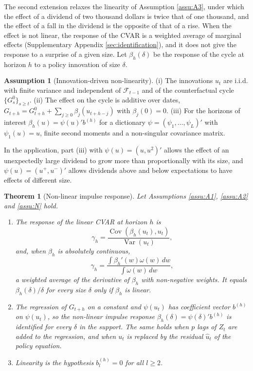 \documentclass[12pt,a4paper]{article}
\newtheorem{thm}{Theorem}
\theoremstyle{definition}
\newtheorem{assumption}{Assumption}
\newcommand{\cov}{\operatorname{Cov}}
\newcommand{\var}{\operatorname{Var}}
\begin{document}
The second extension relaxes the linearity of Assumption \ref{assu:A3}, under which the effect of a dividend of two thousand dollars is twice that of one thousand, and the effect of a fall in the dividend is the opposite of that of a rise. When the effect is not linear, the response of the CVAR is a weighted average of marginal effects (Supplementary Appendix \ref{sec:identification}), and it does not give the response to a surprise of a given size. Let $\beta_h(\delta)$ be the response of the cycle at horizon $h$ to a policy innovation of size $\delta$.

\begin{assumption}[Innovation-driven non-linearity\label{assu:N}]
(i) The innovations $u_t$ are i.i.d. with finite variance and independent of $\mathcal{F}_{t-1}$ and of the counterfactual cycle $\{G^0_s\}_{s\geq t}$. (ii) The effect on the cycle is additive over dates, $G_{t+h}=G^0_{t+h}+\sum_{j\geq0}\beta_j(u_{t+h-j})$ with $\beta_j(0)=0$. (iii) For the horizons of interest $\beta_h(u)=\psi(u)'b^{(h)}$ for a dictionary $\psi=(\psi_1,\dots,\psi_L)'$ with $\psi_1(u)=u$, finite second moments and a non-singular covariance matrix.
\end{assumption}

In the application, part (iii) with $\psi(u)=(u,u^2)'$ allows the effect of an unexpectedly large dividend to grow more than proportionally with its size, and $\psi(u)=(u^+,u^-)'$ allows dividends above and below expectations to have effects of different size.

\begin{thm}[Non-linear impulse response\label{thm:nonlin}]
Let Assumptions \ref{assu:A1}, \ref{assu:A2} and \ref{assu:N} hold.
\begin{enumerate}
\item[(a)] The response of the linear CVAR at horizon $h$ is
\[
\gamma_h=\frac{\cov(\beta_h(u_t),u_t)}{\var(u_t)},
\]
and, when $\beta_h$ is absolutely continuous,
\[
\gamma_h=\frac{\int\beta_h'(w)\omega(w)\,dw}{\int\omega(w)\,dw},
\]
a weighted average of the derivative of $\beta_h$ with non-negative weights. It equals $\beta_h(\delta)/\delta$ for every size $\delta$ only if $\beta_h$ is linear.
\item[(b)] The regression of $G_{t+h}$ on a constant and $\psi(u_t)$ has coefficient vector $b^{(h)}$ on $\psi(u_t)$, so the non-linear impulse response $\beta_h(\delta)=\psi(\delta)'b^{(h)}$ is identified for every $\delta$ in the support. The same holds when $p$ lags of $Z_t$ are added to the regression, and when $u_t$ is replaced by the residual $\hat u_t$ of the policy equation.
\item[(c)] Linearity is the hypothesis $b_l^{(h)}=0$ for all $l\geq2$.
\end{enumerate}
\end{thm}
\end{document}
